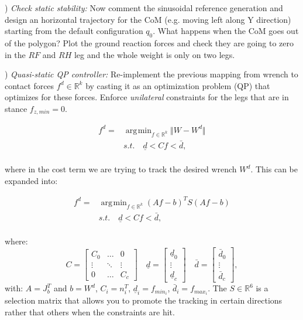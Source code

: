 \documentclass[11pt]{article}
\newcommand{\Rnum}{\mathbb{R}} %
\newcommand{\mat}[1]{\ensuremath{\begin{bmatrix}#1\end{bmatrix}}}	%
\DeclareMathOperator*{\argmin}{\arg\!\min}				%
\begin{document}
\quad

\quad

) \textit{Check static stability:}
Now comment the sinusoidal reference generation and design an horizontal trajectory for the 
CoM (e.g. moving left along Y direction) starting from the default configuration $q_0$. 
What happens when the CoM goes out of the polygon?
Plot the ground reaction forces and check they are going to zero in the $RF$ and $RH$ leg and the whole weight is only on two legs.

) \textit{Quasi-static QP controller:}
Re-implement the previous mapping from wrench to contact forces $f^d \in \Rnum^k$
by casting it as an optimization problem (QP) that optimizes for these forces. 
Enforce \textit{unilateral} constraints for the legs that are in stance $f_{z,min} = 0$. 

\begin{equation} 
\begin{aligned} 
f^d = & \argmin_{f \in \Rnum^k} \Vert W- W^d\Vert\\
& s.t. \quad \underline{d} < C f < \bar{d},\\
\end{aligned} 
\label{eq:min_prob}
\end{equation}

where in the cost term we are trying to track the desired wrench $W^d$. 
This can be expanded into:

\begin{equation} 
\begin{aligned} 
f^d = & \argmin_{f \in \Rnum^k}  (Af-b)^T S (Af-b)\\
& s.t. \quad \underline{d} < C f < \bar{d},\\
\end{aligned} 
\label{eq:min_prob}
\end{equation}

%
where:
\begin{equation}
C = \mat{C_0 & \dots & 0 \\ \vdots & \ddots & \vdots \\ 0 & \dots & C_c} \quad
\underline{d} = \mat{ \underline{d}_0 \\ \vdots \\ \underline{d}_c} \quad
\bar{d} = \mat{\bar{d}_0 \\ \vdots \\ \bar{d}_c},
\end{equation}
%
with: $A = J_b^T$ and $b = W^d$, $C_i = 	n_i^T$, $\underline{d}_i = 	f_{{min}_i}$, $\bar{d}_i =f_{{max}_i}$. 
The $S \in \Rnum^6$ is a selection matrix that allows you to promote the tracking in certain directions rather that others when the constraints are hit.
\end{document}
